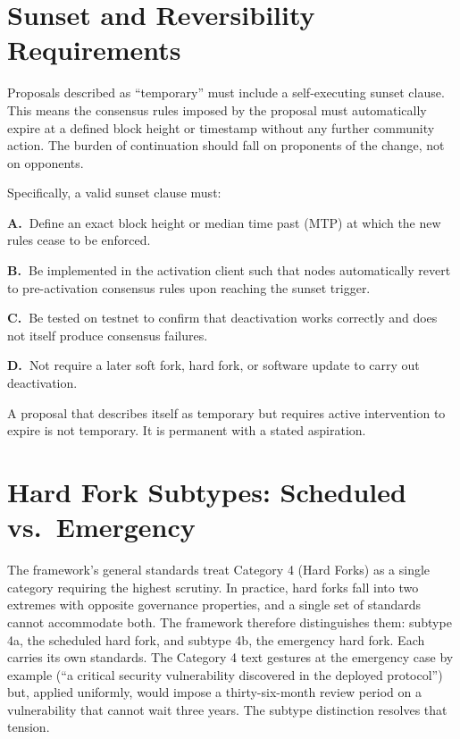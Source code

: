\documentclass[11pt, twoside, openright]{book}
\newcommand{\reqitem}[2]{\medskip\noindent\textbf{#1\ #2}\quad\ignorespaces}
\begin{document}
\section{Sunset and Reversibility Requirements}

Proposals described as ``temporary'' must include a self-executing sunset clause. This means the consensus rules imposed by the proposal must automatically expire at a defined block height or timestamp without any further community action. The burden of continuation should fall on proponents of the change, not on opponents.

Specifically, a valid sunset clause must:

\reqitem{A.}{}Define an exact block height or median time past (MTP) at which the new rules cease to be enforced.

\reqitem{B.}{}Be implemented in the activation client such that nodes automatically revert to pre-activation consensus rules upon reaching the sunset trigger.

\reqitem{C.}{}Be tested on testnet to confirm that deactivation works correctly and does not itself produce consensus failures.

\reqitem{D.}{}Not require a later soft fork, hard fork, or software update to carry out deactivation.

\medskip

A proposal that describes itself as temporary but requires active intervention to expire is not temporary. It is permanent with a stated aspiration.

\section{Hard Fork Subtypes: Scheduled vs.~Emergency}

The framework's general standards treat Category 4 (Hard Forks) as a single category requiring the highest scrutiny. In practice, hard forks fall into two extremes with opposite governance properties, and a single set of standards cannot accommodate both. The framework therefore distinguishes them: subtype 4a, the scheduled hard fork, and subtype 4b, the emergency hard fork. Each carries its own standards. The Category 4 text gestures at the emergency case by example (``a critical security vulnerability discovered in the deployed protocol'') but, applied uniformly, would impose a thirty-six-month review period on a vulnerability that cannot wait three years. The subtype distinction resolves that tension.
\end{document}

